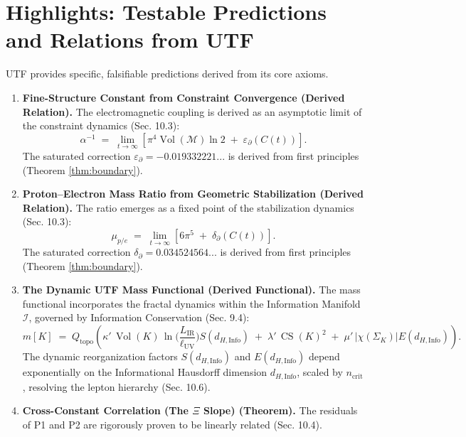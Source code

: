 \documentclass[11pt, a4paper]{article}
\theoremstyle{definition}
\theoremstyle{definition}
\newcommand{\M}{\mathcal{M}}
\newcommand{\Qtopo}{Q_{\text{topo}}}
\newcommand{\Ical}{\mathcal{I}}
\newcommand{\CS}{\operatorname{CS}}
\newcommand{\Vol}{\operatorname{Vol}}
\newcommand{\LIR}{L_{\mathrm{IR}}}
\newcommand{\lUV}{\ell_{\mathrm{UV}}}
\newcommand{\V}[1]{\Vol(#1)}
\newcommand{\Veight}{\Vol(\M)}
\newcommand{\dHInfo}{d_{H,\mathrm{Info}}} %
\newcommand{\ncrit}{n_{\mathrm{crit}}}
\newcommand{\Azero}{\pi^4 \Veight \ln 2}
\newcommand{\Bzero}{6\pi^5}
\begin{document}
\section*{Highlights: Testable Predictions and Relations from UTF}
UTF provides specific, falsifiable predictions derived from its core axioms.
\begin{enumerate}[label=\textbf{P\arabic*}., leftmargin=2.2em]
\item \textbf{Fine-Structure Constant from Constraint Convergence (Derived Relation).} The electromagnetic coupling is derived as an asymptotic limit of the constraint dynamics (Sec. 10.3):
\begin{equation}
  \alpha^{-1} \;=\; \lim_{t \to \infty} \left[ \Azero \;+\; \varepsilon_{\partial}(C(t)) \right].
\end{equation}
The saturated correction $\varepsilon_\partial = -0.019332221...$ is derived from first principles (Theorem \ref{thm:boundary}).

\item \textbf{Proton--Electron Mass Ratio from Geometric Stabilization (Derived Relation).} The ratio emerges as a fixed point of the stabilization dynamics (Sec. 10.3):
\begin{equation}
  \mu_{p/e} \;=\; \lim_{t \to \infty} \left[ \Bzero \;+\; \delta_{\partial}(C(t)) \right].
\end{equation}
The saturated correction $\delta_\partial = 0.034524564...$ is derived from first principles (Theorem \ref{thm:boundary}).

\item \textbf{The Dynamic UTF Mass Functional (Derived Functional).} The mass functional incorporates the fractal dynamics within the Information Manifold $\Ical$, governed by Information Conservation (Sec. 9.4):
\begin{equation}
  m[K] \;=\; \Qtopo \left( \kappa' \,\V{K}\,\ln\!\Big(\frac{\LIR}{\lUV}\Big) S(\dHInfo) \;+\; \lambda'\, \CS(K)^2 \;+\; \mu'\,|\chi(\Sigma_K)| E(\dHInfo) \right).
\end{equation}
The dynamic reorganization factors $S(\dHInfo)$ and $E(\dHInfo)$ depend exponentially on the Informational Hausdorff dimension $\dHInfo$, scaled by $\ncrit$, resolving the lepton hierarchy (Sec. 10.6).

\item \textbf{Cross-Constant Correlation (The $\Xi$ Slope) (Theorem).} The residuals of P1 and P2 are rigorously proven to be linearly related (Sec. 10.4).
\end{enumerate}
\end{document}
